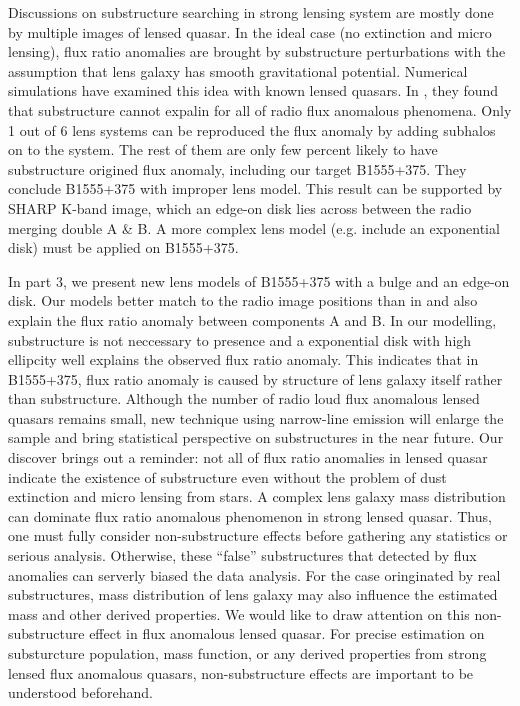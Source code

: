 \documentclass[manuscript]{emulateapj}
\begin{document}
Discussions on substructure searching in strong lensing system are mostly done by multiple images of lensed quasar. In the ideal case (no extinction and micro lensing), flux ratio anomalies are brought by substructure perturbations with the assumption that lens galaxy has smooth gravitational potential. Numerical simulations have examined this idea with known lensed quasars. In \citet{Xu14}, they found that substructure cannot expalin for all of radio flux anomalous phenomena. Only 1 out of 6 lens systems can be reproduced the flux anomaly by adding subhalos on to the system. The rest of them are only few percent likely to have substructure origined flux anomaly, including our target B1555+375. They conclude B1555+375 with improper lens model. This result can be supported by SHARP K-band image, which an edge-on disk lies across between the radio merging double A \& B. A more complex lens model (e.g. include an exponential disk) must be applied on B1555+375.

In part 3, we present new lens models of B1555+375 with a bulge and an edge-on disk. Our models better match to the radio image positions than in \citet{Marlow} and also explain the flux ratio anomaly between components A and B. In our modelling, substructure is not neccessary to presence and a  exponential disk with high ellipcity well explains the observed flux ratio anomaly. This indicates that in B1555+375, flux ratio anomaly is caused by structure of lens galaxy itself rather than substructure. Although the number of radio loud flux anomalous lensed quasars remains small, new technique using narrow-line emission will enlarge the sample and bring statistical perspective on substructures in the near future. Our discover brings out a reminder: not all of flux ratio anomalies in lensed quasar indicate the existence of substructure even without the problem of dust extinction and micro lensing from stars. A complex lens galaxy mass distribution can dominate flux ratio anomalous phenomenon in strong lensed quasar. Thus, one must fully consider non-substructure effects before gathering any statistics or serious analysis. Otherwise, these ``false'' substructures that detected by flux anomalies can serverly biased the data analysis. For the case oringinated by real  substructures, mass distribution of lens galaxy may also influence the estimated mass and other derived properties. We would like to draw attention on this non-substructure effect in flux anomalous lensed quasar. For precise estimation on substurcture population, mass function, or any derived properties from strong lensed flux anomalous quasars, non-substructure effects are important to be understood beforehand.
\end{document}
